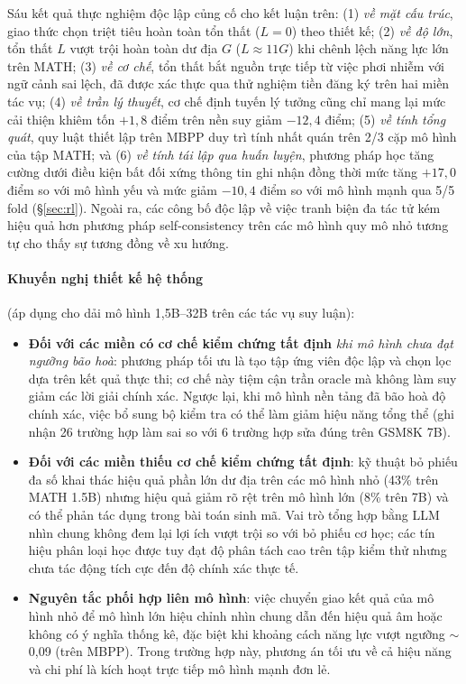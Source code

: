\documentclass[12pt,a4paper]{article}
\begin{document}
Sáu kết quả thực nghiệm độc lập củng cố cho kết luận trên: (1) \emph{về mặt cấu trúc}, giao thức 
chọn triệt tiêu hoàn toàn tổn thất ($L=0$) theo thiết kế; (2) \emph{về độ lớn}, tổn thất $L$
vượt trội hoàn toàn dư địa $G$ ($L \approx 11G$) khi chênh lệch năng lực lớn trên MATH;
(3) \emph{về cơ chế}, tổn thất bắt nguồn trực tiếp từ việc phơi nhiễm với ngữ cảnh sai lệch,
đã được xác thực qua thử nghiệm tiền đăng ký trên hai miền tác vụ; (4) \emph{về trần lý thuyết},
cơ chế định tuyến lý tưởng cũng chỉ mang lại mức cải thiện khiêm tốn $+1{,}8$ điểm trên
nền suy giảm $-12{,}4$ điểm; (5) \emph{về tính tổng quát}, quy luật thiết lập trên MBPP duy trì
tính nhất quán trên 2/3 cặp mô hình của tập MATH; và (6) \emph{về tính tái lập qua huấn luyện},
phương pháp học tăng cường dưới điều kiện bất đối xứng thông tin ghi nhận đồng thời mức tăng
$+17{,}0$ điểm so với mô hình yếu và mức giảm $-10{,}4$ điểm so với mô hình mạnh qua 5/5 fold
(\S\ref{sec:rl}). Ngoài ra, các công bố độc lập về việc tranh biện đa tác tử kém hiệu quả hơn
phương pháp self-consistency trên các mô hình quy mô nhỏ \cite{chen2025debate} tương tự cho thấy sự tương
đồng về xu hướng.

\paragraph{Khuyến nghị thiết kế hệ thống} (áp dụng cho dải mô hình 1,5B--32B trên các tác vụ suy luận):
\begin{itemize}\itemsep2pt
\item \textbf{Đối với các miền có cơ chế kiểm chứng tất định} \emph{khi mô hình chưa đạt ngưỡng bão hoà}: phương pháp tối ưu là tạo tập ứng viên độc
      lập và chọn lọc dựa trên kết quả thực thi; cơ chế này tiệm cận trần oracle mà không làm suy
      giảm các lời giải chính xác. Ngược lại, khi mô hình nền tảng đã bão hoà độ chính xác, việc bổ
      sung bộ kiểm tra có thể làm giảm hiệu năng tổng thể (ghi nhận 26 trường hợp làm sai so với
      6 trường hợp sửa đúng trên GSM8K 7B).
\item \textbf{Đối với các miền thiếu cơ chế kiểm chứng tất định}: kỹ thuật bỏ phiếu đa số khai
      thác hiệu quả phần lớn dư địa trên các mô hình nhỏ (43\% trên MATH 1.5B) nhưng hiệu quả
      giảm rõ rệt trên mô hình lớn (8\% trên 7B) và có thể phản tác dụng trong bài toán sinh
      mã. Vai trò tổng hợp bằng LLM nhìn chung không đem lại lợi ích vượt trội so với bỏ phiếu cơ
      học; các tín hiệu phân loại học được tuy đạt độ phân tách cao trên tập kiểm thử nhưng chưa
      tác động tích cực đến độ chính xác thực tế.
\item \textbf{Nguyên tắc phối hợp liên mô hình}: việc chuyển giao kết quả của mô hình nhỏ để mô hình
      lớn hiệu chỉnh nhìn chung dẫn đến hiệu quả âm hoặc không có ý nghĩa thống kê, đặc biệt khi
      khoảng cách năng lực vượt ngưỡng $\sim$0,09 (trên MBPP). Trong trường hợp này, phương án tối
      ưu về cả hiệu năng và chi phí là kích hoạt trực tiếp mô hình mạnh đơn lẻ.
\end{itemize}
\end{document}
